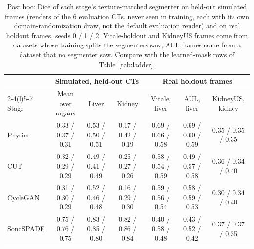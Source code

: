 
\begin{table}[t]
\caption{Post hoc: Dice of each stage's texture-matched segmenter on held-out simulated frames (renders of the 6 evaluation CTs, never seen in training, each with its own domain-randomization draw, not the default evaluation render) and on real holdout frames, seeds 0 / 1 / 2. Vitale-holdout and KidneyUS frames come from datasets whose training splits the segmenters saw; AUL frames come from a dataset that no segmenter saw. Compare with the learned-mask rows of Table~\ref{tab:ladder}.}
\label{tab:seg-sim-real}
\centering
\renewcommand{\baselinestretch}{1}\scriptsize
\setlength{\tabcolsep}{3pt}
\begin{tabular}{@{}lcccccc@{}}
\toprule
 & \multicolumn{3}{c}{Simulated, held-out CTs} & \multicolumn{3}{c}{Real holdout frames} \\
\cmidrule(lr){2-4}\cmidrule(l){5-7}
Stage & Mean over organs & Liver & Kidney & Vitale, liver & AUL, liver & KidneyUS, kidney \\
\midrule
Physics & 0.33 / 0.37 / 0.31 & 0.53 / 0.50 / 0.51 & 0.17 / 0.42 / 0.19 & 0.69 / 0.66 / 0.58 & 0.69 / 0.60 / 0.59 & 0.35 / 0.35 / 0.35 \\
CUT & 0.32 / 0.29 / 0.29 & 0.49 / 0.41 / 0.49 & 0.25 / 0.27 / 0.26 & 0.58 / 0.54 / 0.59 & 0.49 / 0.57 / 0.58 & 0.36 / 0.34 / 0.40 \\
CycleGAN & 0.31 / 0.30 / 0.29 & 0.52 / 0.46 / 0.48 & 0.16 / 0.29 / 0.30 & 0.59 / 0.56 / 0.54 & 0.58 / 0.59 / 0.53 & 0.30 / 0.34 / 0.40 \\
SonoSPADE & 0.75 / 0.76 / 0.75 & 0.83 / 0.85 / 0.80 & 0.82 / 0.86 / 0.84 & 0.40 / 0.58 / 0.48 & 0.43 / 0.52 / 0.42 & 0.37 / 0.37 / 0.35 \\
\bottomrule
\end{tabular}
\end{table}
